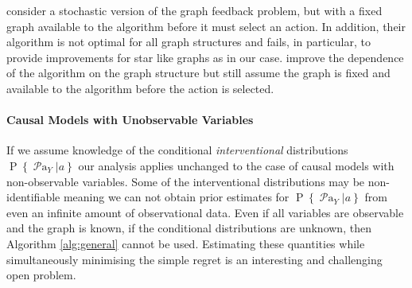 \documentclass[11pt,a4paper,twoside]{report}
\newcommand{\Pn}[2]{\operatorname{P}\left\{#2|#1\right\}}
\newcommand{\parents}[1]{\operatorname{\mathcal{P}a}_{#1}}
\theoremstyle{plain}
\theoremstyle{definition}
\begin{document}
\citet{Lelarge2012} consider a stochastic version of the graph feedback problem, but with a fixed graph available to the algorithm before it must select an action. In addition, their algorithm is not optimal for all graph structures and fails, in particular, to provide improvements for star like graphs as in our case. \citep{Buccapatnam2014} improve the dependence of the algorithm on the graph structure but still assume the graph is fixed and available to the algorithm before the action is selected. 



\paragraph{Causal Models with Unobservable Variables}
If we assume knowledge of the conditional \textit{interventional} distributions $\Pn{a}{\parents{Y}}$ our analysis applies unchanged to the case of causal models with 
non-observable variables. Some of the interventional distributions may be non-identifiable meaning we can not obtain prior estimates for $\Pn{a}{\parents{Y}}$ from 
even an infinite amount of observational data. Even if all variables are observable and the graph is known, if the conditional distributions are unknown, then Algorithm
\ref{alg:general} cannot be used. Estimating these quantities while simultaneously minimising the simple regret is an interesting and challenging open problem.



\end{document}
